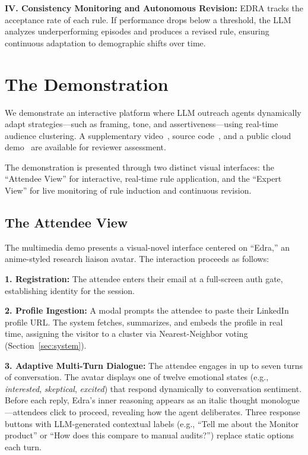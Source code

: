 \documentclass[sigconf]{acmart}
\begin{document}
\noindent\textbf{IV. Consistency Monitoring and Autonomous Revision:}
EDRA tracks the acceptance rate of each rule. If performance drops below a threshold, the LLM analyzes underperforming episodes and produces a revised rule, ensuring continuous adaptation to demographic shifts over time.

\section{The Demonstration}
We demonstrate an interactive platform where LLM outreach agents dynamically adapt strategies—such as framing, tone, and assertiveness—using real-time audience clustering. A supplementary video~\cite{edra-demo-2026}, source code~\cite{edra-github}, and a public cloud demo~\cite{edra-hosted-demo} are available for reviewer assessment.

The demonstration is presented through two distinct visual interfaces: the ``Attendee View'' for interactive, real-time rule application, and the ``Expert View'' for live monitoring of rule induction and continuous revision.


\subsection{The Attendee View}
The multimedia demo presents a visual-novel interface centered on ``Edra,'' an anime-styled research liaison avatar. The interaction proceeds as follows:

\noindent \textbf{1. Registration:} The attendee enters their email at a full-screen auth gate, establishing identity for the session.

\noindent \textbf{2. Profile Ingestion:} A modal prompts the attendee to paste their LinkedIn profile URL. The system fetches, summarizes, and embeds the profile in real time, assigning the visitor to a cluster via Nearest-Neighbor voting (Section~\ref{sec:system}).

\noindent \textbf{3. Adaptive Multi-Turn Dialogue:} The attendee engages in up to seven turns of conversation. The avatar displays one of twelve emotional states (e.g., \textit{interested}, \textit{skeptical}, \textit{excited}) that respond dynamically to conversation sentiment. Before each reply, Edra's inner reasoning appears as an italic thought monologue---attendees click to proceed, revealing how the agent deliberates. Three response buttons with LLM-generated contextual labels (e.g., ``Tell me about the Monitor product'' or ``How does this compare to manual audits?'') replace static options each turn.
\end{document}
